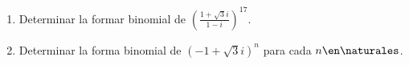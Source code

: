 \ejercicio

\begin{enumerate}[label=\roman*)]
  \item Determinar la formar binomial de
    $ \left(\frac{1 + \sqrt{3} i }{1 - i} \right)^{17}$.

  \item Determinar la forma binomial de
    $(-1 + \sqrt{3}i)^n$ para cada $n \en \naturales$.
\end{enumerate}
